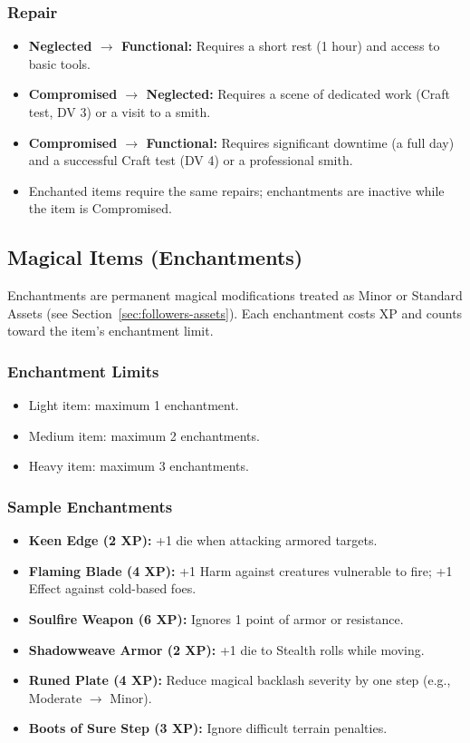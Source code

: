 \subsubsection{Repair}
\begin{itemize}
  \item \textbf{Neglected $\rightarrow$ Functional:} Requires a short rest (1 hour) and access to basic tools.
  \item \textbf{Compromised $\rightarrow$ Neglected:} Requires a scene of dedicated work (Craft test, DV 3) or a visit to a smith.
  \item \textbf{Compromised $\rightarrow$ Functional:} Requires significant downtime (a full day) and a successful Craft test (DV 4) or a professional smith.
  \item Enchanted items require the same repairs; enchantments are inactive while the item is Compromised.
\end{itemize}

\subsection{Magical Items (Enchantments)}

Enchantments are permanent magical modifications treated as Minor or Standard Assets (see Section~\ref{sec:followers-assets}). Each enchantment costs XP and counts toward the item's enchantment limit.

\subsubsection{Enchantment Limits}
\begin{itemize}
  \item Light item: maximum 1 enchantment.
  \item Medium item: maximum 2 enchantments.
  \item Heavy item: maximum 3 enchantments.
\end{itemize}

\subsubsection{Sample Enchantments}
\begin{itemize}
  \item \textbf{Keen Edge (2 XP):} +1 die when attacking armored targets.
  \item \textbf{Flaming Blade (4 XP):} +1 Harm against creatures vulnerable to fire; +1 Effect against cold-based foes.
  \item \textbf{Soulfire Weapon (6 XP):} Ignores 1 point of armor or resistance.
  \item \textbf{Shadowweave Armor (2 XP):} +1 die to Stealth rolls while moving.
  \item \textbf{Runed Plate (4 XP):} Reduce magical backlash severity by one step (e.g., Moderate $\rightarrow$ Minor).
  \item \textbf{Boots of Sure Step (3 XP):} Ignore difficult terrain penalties.
\end{itemize}

